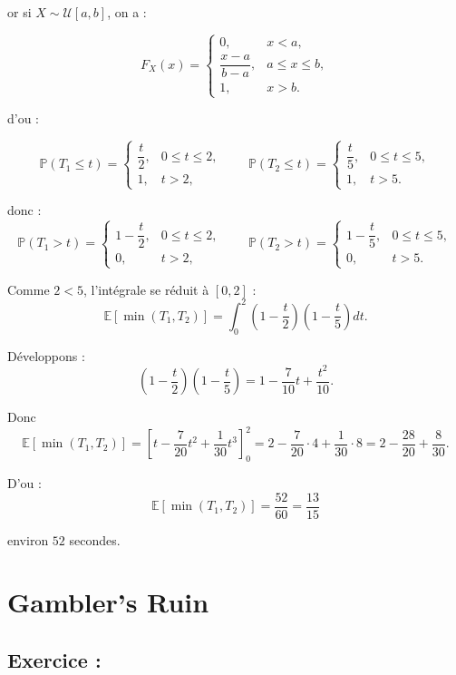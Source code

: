 or si $X \sim \mathcal{U}[a,b]$, on a : 

\[
F_X(x) =
\begin{cases}
0, & x < a, \\[6pt]
\dfrac{x-a}{b-a}, & a \leq x \leq b, \\[10pt]
1, & x > b.
\end{cases}
\]

d'ou : 

\[
\mathbb{P}(T_1 \leq  t)=
\begin{cases}
\dfrac{t}{2}, & 0\le t \le 2,\\
1, & t>2,
\end{cases}
\qquad
\mathbb{P}(T_2 \le t)=
\begin{cases}
\dfrac{t}{5}, & 0\le t \le 5,\\
1, & t>5.
\end{cases}
\]


donc : 
\[
\mathbb{P}(T_1>t)=
\begin{cases}
1-\dfrac{t}{2}, & 0\le t \le 2,\\
0, & t>2,
\end{cases}
\qquad
\mathbb{P}(T_2>t)=
\begin{cases}
1-\dfrac{t}{5}, & 0\le t \le 5,\\
0, & t>5.
\end{cases}
\]

Comme $2<5$, l'intégrale se réduit à $[0,2]$ :
\[
\mathbb{E}[\min(T_1,T_2)]
=\int_{0}^{2} \left(1-\frac{t}{2}\right)\left(1-\frac{t}{5}\right) dt.
\]

Développons :
\[
\left(1-\frac{t}{2}\right)\left(1-\frac{t}{5}\right)
=1-\frac{7}{10}t+\frac{t^2}{10}.
\]

Donc
\[
\mathbb{E}[\min(T_1,T_2)]
=\left[ t - \frac{7}{20} t^2 + \frac{1}{30} t^3 \right]_0^2
= 2 - \frac{7}{20}\cdot 4 + \frac{1}{30}\cdot 8
= 2 - \frac{28}{20} + \frac{8}{30}.
\]

D'ou : 
\[
\boxed{
\mathbb{E}[\min(T_1,T_2)]
= \frac{52}{60} = \frac{13}{15}
}\]

environ $52$ secondes.


\section{Gambler's Ruin}

\subsection*{Exercice :}

